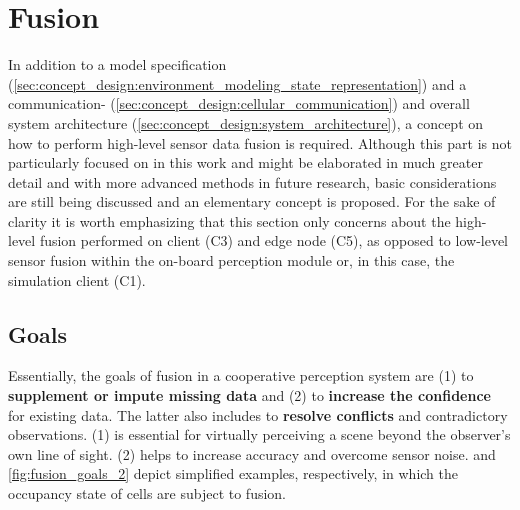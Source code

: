 \section{Fusion}
\label{sec:concept_design:fusion}
In addition to a model specification (\cref{sec:concept_design:environment_modeling_state_representation}) and a communication- (\cref{sec:concept_design:cellular_communication}) and overall system architecture (\cref{sec:concept_design:system_architecture}), a concept on how to perform high-level sensor data fusion is required. Although this part is not particularly focused on in this work and might be elaborated in much greater detail and with more advanced methods in future research, basic considerations are still being discussed and an elementary concept is proposed. For the sake of clarity it is worth emphasizing that this section only concerns about the high-level fusion performed on client (C3) and edge node (C5), as opposed to low-level sensor fusion within the on-board perception module or, in this case, the simulation client (C1).

\subsection{Goals}
\label{subsec:concept_design:fusion_goals}
Essentially, the goals of fusion in a cooperative perception system are (1) to \textbf{supplement or impute missing data} and (2) to \textbf{increase the confidence} for existing data. The latter also includes to \textbf{resolve conflicts} and contradictory observations. (1) is essential for virtually perceiving a scene beyond the observer's own line of sight. (2) helps to increase accuracy and overcome sensor noise.  and \cref{fig:fusion_goals_2} depict simplified examples, respectively, in which the occupancy state of cells are subject to fusion.
\par
\bigskip

